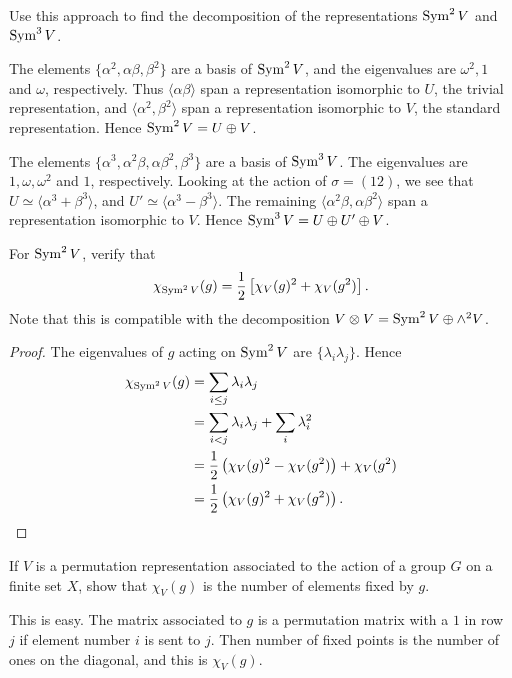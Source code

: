 \documentclass[11pt, english]{article}
\begin{document}
\begin{exc}[Exercise 1.11]
Use this approach to find the decomposition of the representations $\operatorname{Sym}^2 V$ and $\operatorname{Sym}^3 V$.
\end{exc}
\begin{sol}
The elements $\{ \alpha^2, \alpha \beta, \beta^2 \}$ are a basis of $\operatorname{Sym}^2 V$, and the eigenvalues are $\omega^2, 1$ and $\omega$, respectively. Thus $\langle \alpha \beta \rangle$ span a representation isomorphic to $U$, the trivial representation, and $\langle \alpha^2, \beta^2 \rangle$ span a representation isomorphic to $V$, the standard representation. Hence $\operatorname{Sym}^2 V = U \oplus V$.

The elements $\{ \alpha^3, \alpha^2 \beta, \alpha \beta^2, \beta^3 \}$ are a basis of $\operatorname{Sym}^3 V$. The eigenvalues are $1, \omega, \omega^2$ and $1$, respectively. Looking at the action of $\sigma=(12)$, we see that $U \simeq \langle \alpha^3+\beta^3 \rangle$, and $U' \simeq \langle \alpha^3-\beta^3 \rangle$. The remaining $\langle \alpha^2 \beta, \alpha \beta^2 \rangle$ span a representation isomorphic to $V$. Hence $\operatorname{Sym}^3 V = U \oplus U' \oplus V$.
\end{sol}

\begin{exc}[Exercise 2.2]
For $\operatorname{Sym}^2 V$, verify that
\[
\chi_{\operatorname{Sym}^2 V}(g) = \frac 12 \left[ \chi_V(g)^2 + \chi_V(g^2)\right].
\]
Note that this is compatible with the decomposition $V \otimes V = \operatorname{Sym}^2 V \oplus \wedge^2 V$.
\end{exc}
\begin{proof}
The eigenvalues of $g$ acting on $\operatorname{Sym}^2 V$ are $\{\lambda_i \lambda_j \}$. Hence
\begin{align*}
\chi_{\operatorname{Sym}^2 V}(g) &= \sum_{i \leq j} \lambda_i \lambda_j \\
&= \sum_{i < j} \lambda_i \lambda_j + \sum_i \lambda_i^2 \\
&= \frac 12 \left( \chi_V(g)^2 - \chi_V(g^2) \right) + \chi_V(g^2) \\
&= \frac 12  \left( \chi_V(g)^2 + \chi_V(g^2) \right).
\end{align*}
\end{proof}

\begin{exc}
If $V$ is a permutation representation associated to the action of a group $G$ on a finite set $X$, show that $\chi_V(g)$ is the number of elements fixed by $g$.
\end{exc}
\begin{sol}
This is easy. The matrix associated to $g$ is a permutation matrix with a $1$ in row $j$ if element number $i$ is sent to $j$. Then number of fixed points is the number of ones on the diagonal, and this is $\chi_V(g)$.
\end{sol}
\end{document}
